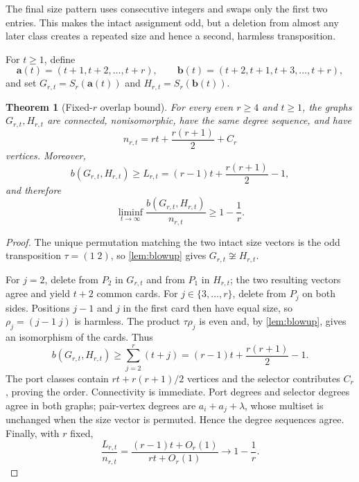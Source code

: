 \documentclass[10pt,a4paper]{amsart}
\newtheorem{theorem}{Theorem}[section]
\begin{document}
The final size pattern uses consecutive integers and swaps only the first two entries. This makes the
intact assignment odd, but a deletion from almost any later class creates a repeated size and hence a
second, harmless transposition.

For $t\ge1$, define
\[
 \mathbf a(t)=(t+1,t+2,\ldots,t+r),\qquad
 \mathbf b(t)=(t+2,t+1,t+3,\ldots,t+r),
\]
and set $G_{r,t}=S_r(\mathbf a(t))$ and $H_{r,t}=S_r(\mathbf b(t))$.


\begin{theorem}[Fixed-$r$ overlap bound]\label{thm:main}
For every even $r\ge4$ and $t\ge1$, the graphs $G_{r,t},H_{r,t}$ are connected, nonisomorphic, have the
same degree sequence, and have
\[
 n_{r,t}=rt+\frac{r(r+1)}2+C_r
\]
vertices. Moreover,
\[
 b(G_{r,t},H_{r,t})\ge L_{r,t}
   =(r-1)t+\frac{r(r+1)}2-1,
\]
and therefore
\[
 \liminf_{t\to\infty}\frac{b(G_{r,t},H_{r,t})}{n_{r,t}}\ge1-\frac1r.
\]
\end{theorem}

\begin{proof}
The unique permutation matching the two intact size vectors is the odd transposition
$\tau=(1\;2)$, so \cref{lem:blowup} gives $G_{r,t}\not\cong H_{r,t}$.

For $j=2$, delete from $P_2$ in $G_{r,t}$ and from $P_1$ in $H_{r,t}$; the two resulting vectors agree
and yield $t+2$ common cards. For $j\in\{3,\ldots,r\}$, delete from $P_j$ on both sides. Positions
$j-1$ and $j$ in the first card then have equal size, so $\rho_j=(j-1\;j)$ is harmless. The product
$\tau\rho_j$ is even and, by \cref{lem:blowup}, gives an isomorphism of the cards. Thus
\[
 b(G_{r,t},H_{r,t})\ge\sum_{j=2}^r(t+j)
 =(r-1)t+\frac{r(r+1)}2-1.
\]
The port classes contain $rt+r(r+1)/2$ vertices and the selector contributes $C_r$, proving the order.
Connectivity is immediate. Port degrees and selector degrees agree in both graphs; pair-vertex degrees
are $a_i+a_j+\lambda$, whose multiset is unchanged when the size vector is permuted. Hence the degree
sequences agree. Finally, with $r$ fixed,
\[
 \frac{L_{r,t}}{n_{r,t}}
 =\frac{(r-1)t+O_r(1)}{rt+O_r(1)}\longrightarrow1-\frac1r.
\]
\end{proof}
\end{document}
